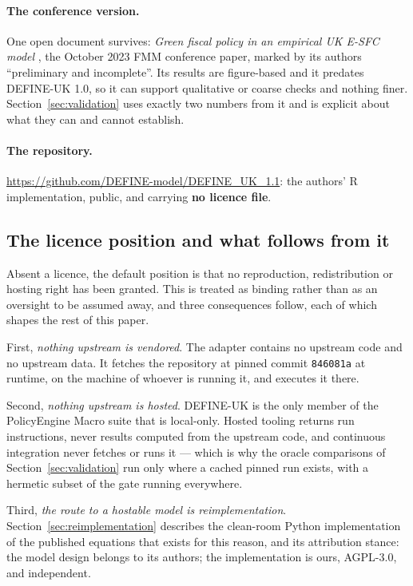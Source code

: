 \paragraph{The conference version.} One open document survives: \emph{Green fiscal policy in an empirical UK E-SFC model} \citep{georgedafermos2023fmm}, the October 2023 FMM conference paper, marked by its authors ``preliminary and incomplete''. Its results are figure-based and it predates DEFINE-UK 1.0, so it can support qualitative or coarse checks and nothing finer. Section~\ref{sec:validation} uses exactly two numbers from it and is explicit about what they can and cannot establish.

\paragraph{The repository.} \url{https://github.com/DEFINE-model/DEFINE_UK_1.1}: the authors' R implementation, public, and carrying \textbf{no licence file}.

\subsection{The licence position and what follows from it}
\label{sec:licence}

Absent a licence, the default position is that no reproduction, redistribution or hosting right has been granted. This is treated as binding rather than as an oversight to be assumed away, and three consequences follow, each of which shapes the rest of this paper.

First, \emph{nothing upstream is vendored}. The adapter contains no upstream code and no upstream data. It fetches the repository at pinned commit \texttt{846081a} at runtime, on the machine of whoever is running it, and executes it there.

Second, \emph{nothing upstream is hosted}. DEFINE-UK is the only member of the PolicyEngine Macro suite that is local-only. Hosted tooling returns run instructions, never results computed from the upstream code, and continuous integration never fetches or runs it --- which is why the oracle comparisons of Section~\ref{sec:validation} run only where a cached pinned run exists, with a hermetic subset of the gate running everywhere.

Third, \emph{the route to a hostable model is reimplementation}. Section~\ref{sec:reimplementation} describes the clean-room Python implementation of the published equations that exists for this reason, and its attribution stance: the model design belongs to its authors; the implementation is ours, AGPL-3.0, and independent.


